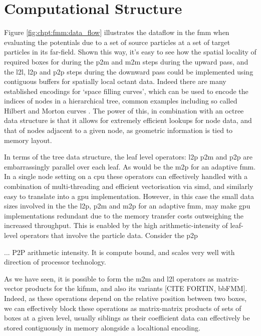 \section{Computational Structure}\label{chpt:fmm:sec:computational_structure}

Figure \ref{fig:chpt:fmm:data_flow} illustrates the dataflow in the \acrshort{fmm} when evaluating the potentials due to a set of source particles at a set of target particles in its far-field. Shown this way, it's easy to see how the spatial locality of required boxes for during the \acrshort{p2m} and \acrshort{m2m} steps during the upward pass, and the \acrshort{l2l}, \acrshort{l2p} and \acrshort{p2p} steps during the downward pass could be implemented using contiguous buffers for spatially local octant data. Indeed there are many established encodings for `space filling curves', which can be used to encode the indices of nodes in a hierarchical tree, common examples including so called Hilbert and Morton curves \cite{sagan2012space}. The power of this, in combination with an octree data structure is that it allows for extremely efficient lookups for node data, and that of nodes adjacent to a given node, as geometric information is tied to memory layout.

In terms of the tree data structure, the leaf level operators: \acrshort{l2p} \acrshort{p2m} and \acrshort{p2p} are embarrassingly parallel over each leaf. As would be the \acrshort{m2p} for an adaptive \acrshort{fmm}. In a single node setting on a \acrshort{cpu} these operators can effectively handled with a combination of multi-threading and efficient vectorisation via \acrshort{simd}, and similarly easy to translate into a \acrshort{gpu} implementation. However, in this case the small data sizes involved in the the \acrshort{l2p}, \acrshort{p2m} and \acrshort{m2p} for an adaptive \acrshort{fmm}, may make \acrshort{gpu} implementations redundant due to the memory transfer costs outweighing the increased throughput. This is enabled by the high arithmetic-intensity of leaf-level operators that involve the particle data. Consider the \acrshort{p2p}

... P2P arithmetic intensity. It is compute bound, and scales very well with direction of processor technology.

As we have seen, it is possible to form the \acrshort{m2m} and \acrshort{l2l} operators as matrix-vector products for the \acrshort{kifmm}, and also its variants [CITE FORTIN, bbFMM]. Indeed, as these operations depend on the relative position between two boxes, we can effectively block these operations as matrix-matrix products of sets of boxes at a given level, usually siblings as their coefficient data can effectively be stored contiguously in memory alongside a localtional encoding.


